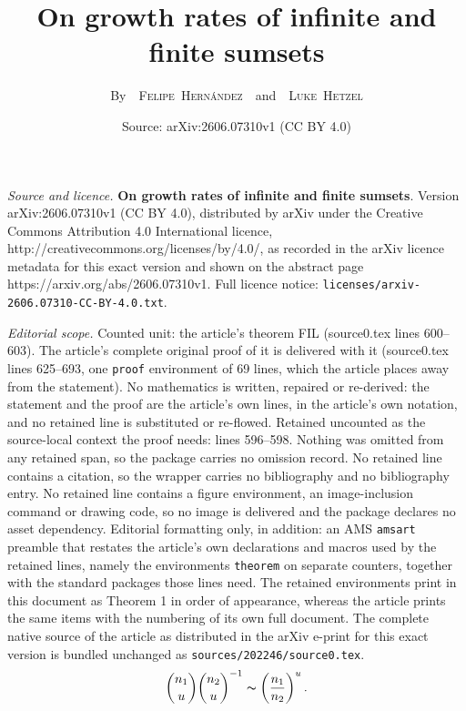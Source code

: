 \documentclass[10pt,a4paper]{amsart}
\title{{\bfseries On growth rates of infinite and finite sumsets}}
\author{By~~{\scshape Felipe~Hern\'andez}~~and~~{\scshape Luke~Hetzel}}
\date{Source: arXiv:2606.07310v1 (CC BY 4.0)}
\begin{document}
\maketitle

\noindent\emph{Source and licence.} {\bfseries On growth rates of infinite and finite sumsets}. Version arXiv:2606.07310v1 (CC BY 4.0), distributed by arXiv under the Creative Commons Attribution 4.0 International licence, http://creativecommons.org/licenses/by/4.0/, as recorded in the arXiv licence metadata for this exact version and shown on the abstract page https://arxiv.org/abs/2606.07310v1. Full licence notice: \texttt{licenses/arxiv-2606.07310-CC-BY-4.0.txt}.\par\smallskip

\noindent\textit{Editorial scope.} Counted unit: the article's theorem FIL (source0.tex lines 600--603). The article's complete original proof of it is delivered with it (source0.tex lines 625--693, one \texttt{proof} environment of 69 lines, which the article places away from the statement). No mathematics is written, repaired or re-derived: the statement and the proof are the article's own lines, in the article's own notation, and no retained line is substituted or re-flowed.  Retained uncounted as the source-local context the proof needs: lines 596--598.  Nothing was omitted from any retained span, so the package carries no omission record.  No retained line contains a citation, so the wrapper carries no bibliography and no bibliography entry.  No retained line contains a figure environment, an image-inclusion command or drawing code, so no image is delivered and the package declares no asset dependency.  Editorial formatting only, in addition: an AMS \texttt{amsart} preamble that restates the article's own declarations and macros used by the retained lines, namely the environments \texttt{theorem} on separate counters, together with the standard packages those lines need.  The retained environments print in this document as Theorem 1 in order of appearance, whereas the article prints the same items with the numbering of its own full document.  The complete native source of the article as distributed in the arXiv e-print for this exact version is bundled unchanged as \texttt{sources/202246/source0.tex}.
\begin{equation}\label{estimate-binomial-coeff}
   \binom{n_1}{u}\binom{n_2}{u}^{-1}\thicksim \left(\frac{n_1}{n_2}\right)^u   . 
\end{equation}
\end{document}
